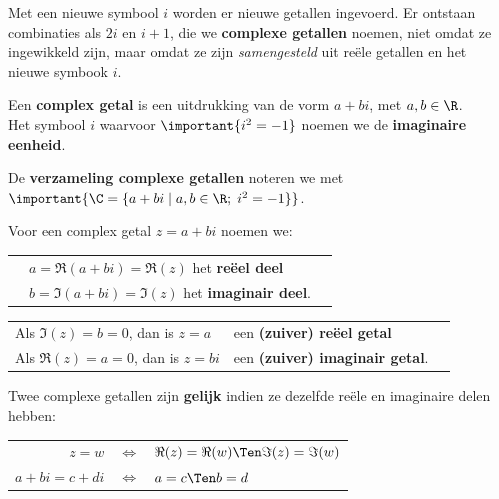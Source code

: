 \documentclass{ximera}
\begin{document}
	\author{Wim Obbels}
	\label{xim:cmplx_definitie_algebraisch}
    
Met een nieuwe symbool $i$  worden er nieuwe getallen ingevoerd. 
Er ontstaan combinaties als $2i$ en $i+1$, die we \textbf{complexe getallen} noemen, niet omdat ze ingewikkeld zijn, maar omdat ze zijn \textit{samengesteld}  uit reële getallen en het nieuwe symbook $i$.


\begin{definition}\label{def:complex_getal}\label{def:reeel_deel}\label{def:imaginair_deel}\nl
	
    Een \textbf{complex getal} is een uitdrukking van de vorm \(a+bi\), met \(a,b \in \R\).
    \\
    Het symbool \(i\) waarvoor \( \important{i^2=-1}\) noemen we de \textbf{imaginaire eenheid}.
    
De \textbf{verzameling complexe getallen} noteren we met \(\important{\C=\{a+bi \;|\; a,b\in\R;\; i^2=-1\}} \).

Voor een complex getal $z=a+bi$ noemen we: \\
\begin{tabular}{@{\quad}l@{ }ll}    
    & $a=\Re(a+bi)=\Re(z)$ het \textbf{reëel deel}  \\
    & $b=\Im(a+bi)=\Im(z)$ het \textbf{imaginair deel}.
\end{tabular}

\begin{tabular}{@{}l@{ }ll}    
    Als $\Im(z) = b=0$, dan is $z=a$ & een \textbf{(zuiver) re\"eel getal}  \\%
    Als $\Re(z) = a=0$, dan is $z=bi$ & een \textbf{(zuiver) imaginair getal}.
\end{tabular}
    
    
Twee complexe getallen zijn \textbf{gelijk} indien ze  dezelfde reële en imaginaire delen hebben:
\vspace{-0.35cm}
\begin{center}
    \begin{tabular}{rcl}
        \(z = w\) &\(\iff\)& \(\Re(z)=\Re(w) \Ten \Im(z)=\Im(w)\) \\    
        \(a+bi = c + di \)  &\(\iff\)& \(a = c \Ten b = d \)\\   
    \end{tabular}
\end{center}

\end{definition}
\end{document}
